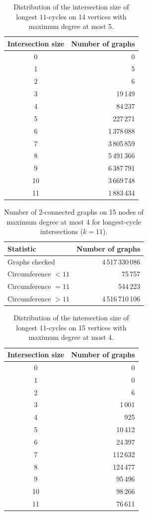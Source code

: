 \begin{table}[ht]
\centering
\caption{Distribution of the intersection size of longest $11$-cycles on 14 vertices with maximum degree at most 5.}
\label{tab:intersection-d14d5}
\begin{tabular}{cr}
\toprule
Intersection size & Number of graphs \\
\midrule
0 & 0 \\
1 & 5 \\
2 & 6 \\
3 & 19\,149 \\
4 & 84\,237 \\
5 & 227\,271 \\
6 & 1\,378\,088 \\
7 & 3\,805\,859 \\
8 & 5\,491\,366 \\
9 & 6\,387\,791 \\
10 & 3\,669\,748 \\
11 & 1\,883\,434 \\
\bottomrule
\end{tabular}
\end{table}

\begin{table}[ht]
\centering
\caption{Number of 2-connected graphs on 15 nodes of maximum degree at most 4 for longest-cycle intersections ($k=11$).}
\label{tab:summary-geng-2con-n15}
\begin{tabular}{lr}
\toprule
Statistic & Number of graphs \\
\midrule
Graphs checked & 4\,517\,330\,086 \\
Circumference $<11$ & 75\,757 \\
Circumference $=11$ & 544\,223 \\
Circumference $>11$ & 4\,516\,710\,106 \\
\bottomrule
\end{tabular}
\end{table}


\begin{table}[ht]
\centering
\caption{Distribution of the intersection size of longest $11$-cycles on 15 vertices with maximum degree at most 4.}
\label{tab:intersection-d15d4}
\begin{tabular}{cr}
\toprule
Intersection size & Number of graphs \\
\midrule
0 & 0 \\
1 & 0 \\
2 & 6 \\
3 & 1\,001 \\
4 & 925 \\
5 & 10\,412 \\
6 & 24\,397 \\
7 & 112\,632 \\
8 & 124\,477 \\
9 & 95\,496 \\
10 & 98\,266 \\
11 & 76\,611 \\
\bottomrule
\end{tabular}
\end{table}

